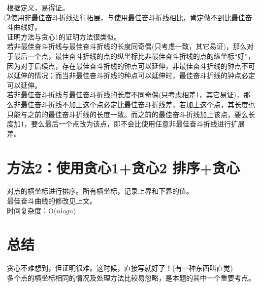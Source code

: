 \documentclass{article}
\begin{document}
		\indent 根据定义，易得证。\\
		
		\indent \textcircled{2}使用非最佳奋斗折线进行拓展，与使用最佳奋斗折线相比，肯定做不到比最佳奋斗曲线好。\\
		
		\indent 证明方法与贪心1的证明方法很类似。\\
		
		\indent 若非最佳奋斗折线与最佳奋斗折线的长度同奇偶(只考虑一致，其它易证)，那么对于最后一个点，最佳奋斗折线的点的纵坐标比非最佳奋斗折线的点的纵坐标“好”，因为对于后续点，存在最佳奋斗折线的钟点可以延伸，非最佳奋斗折线的钟点不可以延伸的情况；而当非最佳奋斗折线的种点可以延伸时，最佳奋斗折线的钟点必定可以延伸。\\
		
		\indent 若非最佳奋斗折线与最佳奋斗折线的长度不同奇偶(只考虑相差1，其它易证)，那么非最佳奋斗折线不加上这个点必定比最佳奋斗折线差，若加上这个点，其长度也只能与之前的最佳奋斗折线的长度一致。而之前的最佳奋斗折线加上该点，要么长度加1，要么最后一个点改为该点，即不会比使用任意非最佳奋斗折线进行扩展差。

		\section{方法2：使用贪心1+贪心2 \quad 排序+贪心}
		
		\indent 对点的横坐标进行排序。所有横坐标，记录上界和下界的值。\\
		
		\indent 最佳奋斗曲线的修改见上文。\\
		
		\indent 时间复杂度：O($nlogn$)
		
		\section{总结}
		贪心不难想到，但证明很难。这时候，直接写就好了！(有一种东西叫直觉)\\
		
		多个点的横坐标相同的情况及处理方法比较易忽略，是本题的其中一个重要考点。
	
\end{document}
